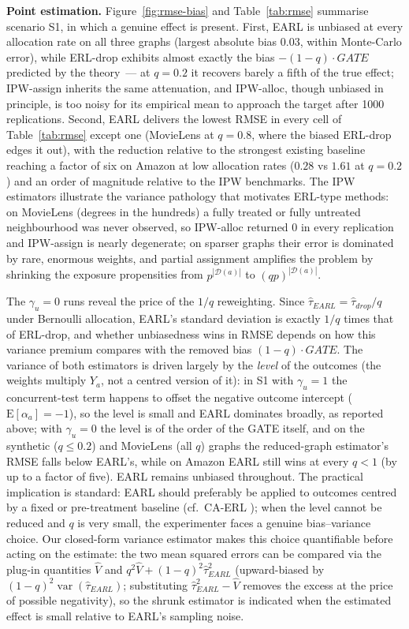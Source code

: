 \documentclass[sigconf,anonymous,review]{acmart}
\newcommand{\E}{\mathrm E}
\DeclareMathOperator{\var}{var}
\begin{document}
\textbf{Point estimation.} Figure~\ref{fig:rmse-bias} and Table~\ref{tab:rmse} summarise scenario S1, in which a genuine effect is present. First, EARL is unbiased at every allocation rate on all three graphs (largest absolute bias $0.03$, within Monte-Carlo error), while ERL-drop exhibits almost exactly the bias $-(1-q)\cdot GATE$ predicted by the theory~--- at $q=0.2$ it recovers barely a fifth of the true effect; IPW-assign inherits the same attenuation, and IPW-alloc, though unbiased in principle, is too noisy for its empirical mean to approach the target after 1000 replications. Second, EARL delivers the lowest RMSE in every cell of Table~\ref{tab:rmse} except one (MovieLens at $q=0.8$, where the biased ERL-drop edges it out), with the reduction relative to the strongest existing baseline reaching a factor of six on Amazon at low allocation rates ($0.28$ vs $1.61$ at $q=0.2$) and an order of magnitude relative to the IPW benchmarks. The IPW estimators illustrate the variance pathology that motivates ERL-type methods: on MovieLens (degrees in the hundreds) a fully treated or fully untreated neighbourhood was never observed, so IPW-alloc returned $0$ in every replication and IPW-assign is nearly degenerate; on sparser graphs their error is dominated by rare, enormous weights, and partial assignment amplifies the problem by shrinking the exposure propensities from $p^{|\mathcal D(a)|}$ to $(qp)^{|\mathcal D(a)|}$.

The $\gamma_u=0$ runs reveal the price of the $1/q$ reweighting. Since $\hat\tau_{EARL} = \hat\tau_{drop}/q$ under Bernoulli allocation, EARL's standard deviation is exactly $1/q$ times that of ERL-drop, and whether unbiasedness wins in RMSE depends on how this variance premium compares with the removed bias $(1-q)\cdot GATE$. The variance of both estimators is driven largely by the \emph{level} of the outcomes (the weights multiply $Y_a$, not a centred version of it): in S1 with $\gamma_u=1$ the concurrent-test term happens to offset the negative outcome intercept ($\E[\alpha_a]=-1$), so the level is small and EARL dominates broadly, as reported above; with $\gamma_u=0$ the level is of the order of the GATE itself, and on the synthetic ($q\le 0.2$) and MovieLens (all $q$) graphs the reduced-graph estimator's RMSE falls below EARL's, while on Amazon EARL still wins at every $q<1$ (by up to a factor of five). EARL remains unbiased throughout. The practical implication is standard: EARL should preferably be applied to outcomes centred by a fixed or pre-treatment baseline (cf.\ CA-ERL \cite{shi2025scalableanalysisbipartiteexperiments}); when the level cannot be reduced and $q$ is very small, the experimenter faces a genuine bias--variance choice. Our closed-form variance estimator makes this choice quantifiable before acting on the estimate: the two mean squared errors can be compared via the plug-in quantities $\hat V$ and $q^2\hat V + (1-q)^2\hat\tau^2_{EARL}$ (upward-biased by $(1-q)^2\var(\hat\tau_{EARL})$; substituting $\hat\tau^2_{EARL}-\hat V$ removes the excess at the price of possible negativity), so the shrunk estimator is indicated when the estimated effect is small relative to EARL's sampling noise.
\end{document}
